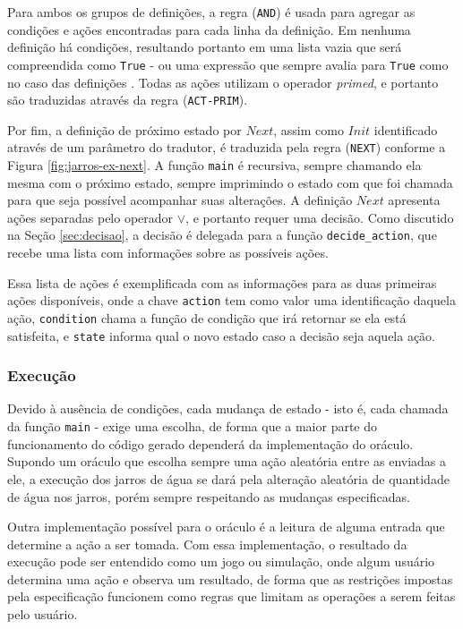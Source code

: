 Para ambos os grupos de definições, a regra (\texttt{AND}) é usada para agregar
as condições e ações encontradas para cada linha da definição. Em nenhuma
definição há condições, resultando portanto em uma lista vazia que será
compreendida como \texttt{True} - ou uma expressão que sempre avalia para
\texttt{True} como no caso das definições \IF. Todas as ações utilizam o operador
\textit{primed}, e portanto são traduzidas através da regra (\texttt{ACT-PRIM}).

Por fim, a definição de próximo estado por $Next$, assim como $Init$ identificado através
de um parâmetro do tradutor, é traduzida pela regra (\texttt{NEXT}) conforme a
Figura \ref{fig:jarros-ex-next}. A função \texttt{main} é recursiva, sempre
chamando ela mesma com o próximo estado, sempre imprimindo o estado com que foi
chamada para que seja possível acompanhar suas alterações. A definição $Next$
apresenta ações separadas pelo operador $\lor$, e portanto requer uma decisão.
Como discutido na Seção \ref{sec:decisao}, a decisão é delegada para a função
\texttt{decide\_action}, que recebe uma lista com informações sobre as possíveis
ações.

Essa lista de ações é exemplificada com as informações para as duas primeiras
ações disponíveis, onde a chave \texttt{action} tem como valor uma identificação
daquela ação, \texttt{condition} chama a função de condição que irá retornar se
ela está satisfeita, e \texttt{state} informa qual o novo estado caso a decisão
seja aquela ação.

\subsubsection{Execução}

Devido à ausência de condições, cada mudança de estado - isto é, cada chamada da
função \texttt{main} - exige uma escolha, de forma que a maior parte do
funcionamento do código gerado dependerá da implementação do oráculo. Supondo um
oráculo que escolha sempre uma ação aleatória entre as enviadas a ele, a
execução dos jarros de água se dará pela alteração aleatória de quantidade de
água nos jarros, porém sempre respeitando as mudanças especificadas.

Outra implementação possível para o oráculo é a leitura de alguma entrada que
determine a ação a ser tomada. Com essa implementação, o resultado da execução
pode ser entendido como um jogo ou simulação, onde algum usuário determina uma
ação e observa um resultado, de forma que as restrições impostas pela
especificação funcionem como regras que limitam as operações a serem feitas pelo
usuário.


